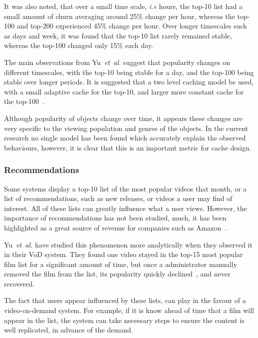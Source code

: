     It was also noted, that over a small time scale, \emph{i.e} hours, the top-10 list had a small amount of churn averaging around 25\% change per hour, whereas the top-100 and top-200 experienced 45\% change per hour. Over longer timescales such as days and week, it was found that the top-10 list rarely remained stable, whereas the top-100 changed only 15\% each day.

    The main observations from Yu~\emph{et~al.} suggest that popularity changes on different timescales, with the top-10 being stable for a day, and the top-100 being stable over longer periods. It is suggested that a two level caching model be used, with a small adaptive cache for the top-10, and larger more constant cache for the top-100~\cite{paneda2006pav}.

    Although popularity of objects change over time, it appears these changes are very specific to the viewing population and genres of the objects. In the current research no single model has been found which accurately explain the observed behaviours, however, it is clear that this is an important metric for cache design.

\subsubsection{Recommendations}

    Some systems display a top-10 list of the most popular videos that month, or a list of recommendations, such as new releases, or videos a user may find of interest. All of these lists can greatly influence what a user views. However, the importance of recommendations has not been studied, much, it has been highlighted as a great source of revenue for companies such as Amazon~\cite{anderson2006tlt}.

    Yu~\emph{et~al.} have studied this phenomenon more analytically when they observed it in their VoD system. They found one video stayed in the top-15 most popular film list for a significant amount of time, but once a administrator manually removed the film from the list, its popularity quickly declined~\cite{yu2006uub}, and never recovered.

    The fact that users appear influenced by these lists, can play in the favour of a video-on-demand system. For example, if it is know ahead of time that a film will appear in the list, the system can take necessary steps to ensure the content is well replicated, in advance of the demand.

